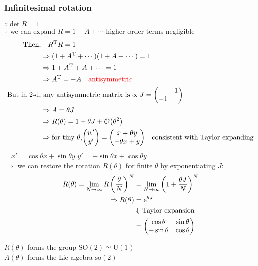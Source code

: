 \documentclass[11pt,fleqn]{book} %
\begin{document}
\subsubsection{Infinitesimal rotation}
  \(\because \det R = 1\) \\
  \(\therefore\) we can expand \(R = 1 + A + \cdots\) \quad higher order terms negligible
\begin{align*}
  \text{Then,}       &\quad R^{\mathrm{T}} R = 1                                                  \\
                     &\Rightarrow (1+ A^{\mathrm{T}} + \cdots) (1 + A + \cdots) = 1               \\
                     &\Rightarrow 1+A^{\mathrm{T}} + A + \cdots = 1                               \\
                     &\Rightarrow A^{\mathrm{T}} = -A \quad \text{\textcolor{red}{antisymmetric}} \\
  \text{But in 2-d,} &\ \text{any antisymmetric matrix is} \propto J = \mqty(\admat{1,-1})        \\
                     &\Rightarrow A = \theta J                                                    \\
                     &\Rightarrow R(\theta) = 1 + \theta J + \order{\theta^2}                     \\
                     &\Rightarrow \text{for tiny \(\theta\),} \mqty(w' \\ y') = \mqty(x + \theta y \\ -\theta x + y) \quad \text{consistent with Taylor expanding}
\end{align*}
\(\quad x' = \cos \theta x + \sin \theta y\) \quad \( y' = -\sin \theta x + \cos \theta
y\)\\
\(\Rightarrow\) we can restore the rotation \(R(\theta)\) for finite \(\theta\)
by exponentiating \(J\):
\begin{align*}
  R(\theta) = \lim_{N \to \infty} R\left( \frac{\theta}{N} \right)^N &= \lim_{N \to \infty} \left( 1 + \frac{\theta J}{N} \right)^N\\
            \Rightarrow R(\theta)                                    &= \ee^{\theta J} \\
                                                                     &\Downarrow \text{Taylor expansion} \\
                                                                     &= \mqty(\cos \theta & \sin \theta \\ -\sin \theta & \cos \theta)
\end{align*}
\begin{remark}
  \(R(\theta)\) forms the group \(\mathrm{SO}(2) \simeq \mathrm{U}(1)\) \\
  \(A(\theta)\) forms the Lie algebra \(\mathrm{so}(2)\)
\end{remark}
\end{document}
